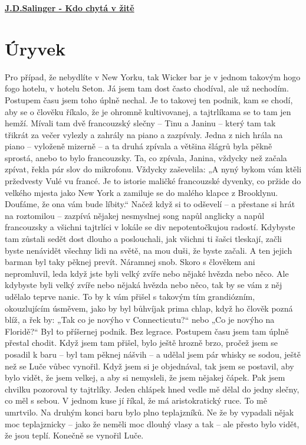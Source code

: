 \documentclass[11pt]{article}
\begin{document}
    \begin{center}
        \underline{\textbf{\Huge J.D.Salinger - Kdo chytá v žitě}}
    \end{center}
    \section*{Úryvek}
    Pro případ, že nebydlíte v New Yorku, tak Wicker bar je v jednom takovým
hogo fogo hotelu, v hotelu Seton. Já jsem tam dost často chodíval, ale už
nechodím. Postupem času jsem toho úplně nechal. Je to takovej ten
podnik, kam se chodí, aby se o člověku říkalo, že je ohromně kultivovanej,
a tajtrlíkama se to tam jen hemží. Mívali tam dvě francouzský slečny – Tinu
a Janinu – který tam tak třikrát za večer vylezly a zahrály na piano a
zazpívaly. Jedna z nich hrála na piano – vyloženě mizerně – a ta druhá
zpívala a většina šlágrů byla pěkně sprostá, anebo to bylo francouzsky. Ta,
co zpívala, Janina, vždycky než začala zpívat, řekla pár slov do mikrofonu.
Vždycky zaševelila: „A nyný bykom vám ktěli pržedvesty Vulé vu francé. Je
to istorie maličké francouzské dyvenky, co pržide do velkého mjesta jako
New York a zamiluje se do malého klapce z Brooklynu. Doufáme, že ona
vám bude líbity.“ Načež když si to odševelí – a přestane si hrát na
roztomilou – zazpívá nějakej nesmyslnej song napůl anglicky a napůl
francouzsky a všichni tajtrlíci v lokále se div nepotentočkujou radostí.
Kdybyste tam zůstali sedět dost dlouho a poslouchali, jak všichni ti šašci
tleskají, začli byste nenávidět všechny lidi na světě, na mou duši, že byste
začali.
A ten jejich barman byl taky pěknej prevít. Náramnej snob. Skoro s
člověkem ani nepromluvil, leda když jste byli velký zvíře nebo nějaké
hvězda nebo něco. Ale kdybyste byli velký zvíře nebo nějaká hvězda nebo
něco, tak by se vám z něj udělalo teprve nanic. To by k vám přišel s
takovým tím grandiózním, okouzlujícím úsměvem, jako by byl bůhvíjak
prima chlap, když ho člověk pozná blíž, a řek by: „Tak co je novýho v
Connecticutu?“ nebo „Co je novýho na Floridě?“ Byl to příšernej podnik.
Bez legrace. Postupem času jsem tam úplně přestal chodit.
Když jsem tam přišel, bylo ještě hrozně brzo, pročež jsem se posadil k
baru – byl tam pěknej nášvih – a udělal jsem pár whisky se sodou, ještě
než se Luče vůbec vynořil. Když jsem si je objednával, tak jsem se postavil,
aby bylo vidět, že jsem velkej, a aby si nemysleli, že jsem nějakej čápek.
Pak jsem chvilku pozoroval ty tajtrlíky. Jeden chlápek hned vedle mě dělal
do jedny slečny, co měl s sebou. V jednom kuse jí říkal, že má
aristokratický ruce. To mě umrtvilo. Na druhým konci baru bylo plno
teplajzníků. Ne že by vypadali nějak moc teplajznicky – jako že neměli moc
dlouhý vlasy a tak – ale přesto bylo vidět, že jsou teplí. Konečně se vynořil
Luče.
\end{document}

